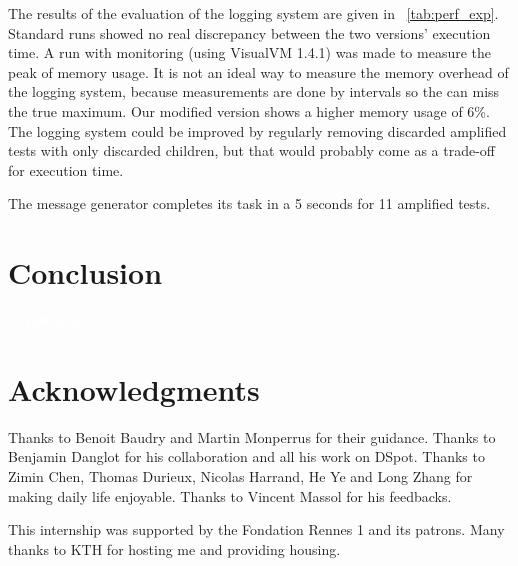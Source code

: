 \documentclass[a4paper,11pt]{sdm_internship}
\newcommand{\todo}[1]{\colorbox{Red!75}{\textcolor{white}{\textbf{TODO\ifx&#1&\else: #1\fi}}}}
\newcommand{\dspot}{DSpot\xspace}
\theoremstyle{definition}
\begin{document}
The results of the evaluation of the logging system are given in \tablename~\ref{tab:perf_exp}.
Standard runs showed no real discrepancy between the two versions' execution time.
A run with monitoring (using VisualVM 1.4.1) was made to measure the peak of memory usage.
It is not an ideal way to measure the memory overhead of the logging system, because measurements are done by intervals so the can miss the true maximum.
Our modified version shows a higher memory usage of 6\%.
The logging system could be improved by regularly removing discarded amplified tests with only discarded children, but that would probably come as a trade-off for execution time.

The message generator completes its task in a 5 seconds for 11 amplified tests.


\section*{Conclusion}%
\label{sec:conclu}%
\todo{}


\section*{Acknowledgments}%
\label{sec:ack}%
Thanks to Benoit Baudry and Martin Monperrus for their guidance.
Thanks to Benjamin Danglot for his collaboration and all his work on \dspot.
Thanks to Zimin Chen, Thomas Durieux, Nicolas Harrand, He Ye and Long Zhang for making daily life enjoyable.
Thanks to Vincent Massol for his feedbacks.

This internship was supported by the Fondation Rennes 1 and its patrons.
Many thanks to KTH for hosting me and providing housing.


%

\end{document}
